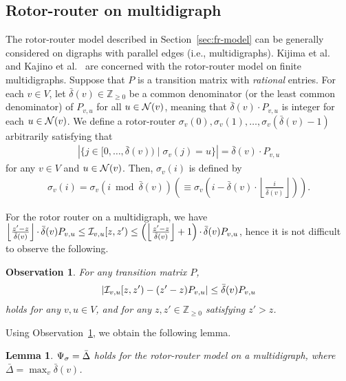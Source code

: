\documentclass[letter, 11pt]{article}
\newcommand{\1}{\mbox{1}\hspace{-0.25em}\mbox{l}}
\newcommand{\I}{{\cal I}} \newcommand{\C}{{\cal C}} \newcommand{\dtv}{{\cal D}_{\rm tv}}
\newtheorem{lemma}[theorem]{Lemma}
\newtheorem{observation}[theorem]{Observation}
\begin{document}
\subsection{Rotor-router on multidigraph}\label{sec:roter}
The rotor-router model described in Section~\ref{sec:fr-model} 
   can be generally considered on digraphs with parallel edges (i.e., multidigraphs). 
 Kijima et al.~\cite{KKM12} and Kajino et al.~\cite{KKM13} are concerned with 
   the rotor-router model on finite multidigraphs. 
 Suppose that $P$ is a transition matrix with {\em rational} entries. 
 For each $v \in V$, 
  let 
  $\bar{\delta}(v) \in \mathbb{Z}_{\geq 0}$ be a common denominator (or the least common denominator) 
   of $P_{v,u}$ for all $u \in {\cal N}(v)$, 
  meaning that $\bar{\delta}(v) \cdotp P_{v,u}$ is integer for each $u\in {\cal N}(v)$. 
 We define a rotor-router 
   $\sigma_v(0), \sigma_v(1), \ldots , \sigma_v(\bar{\delta}(v)-1)$ arbitrarily 
  satisfying that 
\begin{eqnarray*}
  \left|\{ j\in[ 0, \ldots, \bar{\delta}(v)) \mid \sigma_v(j)=u \}\right| =\bar{\delta}(v)\cdotp P_{v,u}
\end{eqnarray*}
 for any $v\in V$ and $u \in {\cal N}(v)$. 
Then, $\sigma_v(i)$ is defined by 
\begin{eqnarray}
\sigma_v(i)= \sigma_v(i \bmod \bar{\delta}(v)) \left(\equiv \sigma_v\left(i - \bar{\delta}(v) \cdotp \left\lfloor \frac{i}{\bar{\delta}(v)} \right\rfloor \right) \right). 
\end{eqnarray}

 For the rotor router on a multidigraph, we have $\left \lfloor \frac{z'-z}{{\bar \delta}(v)}\right \rfloor\cdotp {\bar \delta}(v)P_{v,u}\leq \I_{v, u}[z, z')\leq \left(\left \lfloor \frac{z'-z}{{\bar \delta}(v)}\right \rfloor +1\right)\cdotp {\bar \delta}(v)P_{v,u}$, hence
  it is not difficult to observe the following. 
\begin{observation}\label{bound:rotorz}
For any transition matrix $P$, 
\begin{eqnarray*}
\left| \I_{v, u}[z, z')-(z'-z)P_{v, u}\right|\leq \bar{\delta}(v)P_{v,u}
\end{eqnarray*}
 holds for any $v, u\in V$, and for any $z, z'\in \mathbb{Z}_{\geq 0}$ satisfying $z'>z$. 
\end{observation}
Using Observation~\ref{bound:rotorz}, we obtain the following lemma. 
\begin{lemma}\label{bound:rotor}
 $\Psi_\sigma =\bar{\Delta}$ holds for the rotor-router model on a multidigraph, where $\bar{\Delta}=\max_v\bar{\delta}(v)$. 
\end{lemma}
\end{document}
